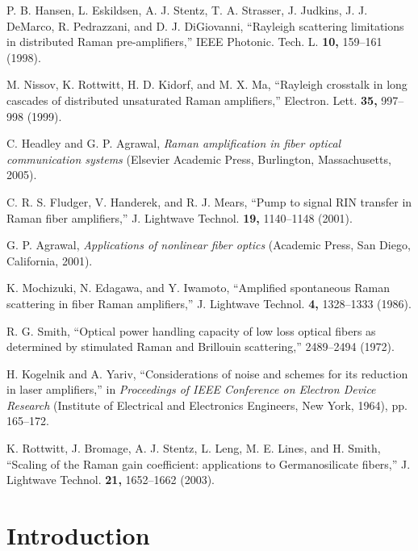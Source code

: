 \documentclass[10pt,letterpaper]{article}
\begin{document}
\begin{thebibliography}{99}
 P. B. Hansen, L. Eskildsen, A. J. Stentz, T. A. Strasser, J. Judkins, J. J. DeMarco, R. Pedrazzani, and D. J. DiGiovanni, ``Rayleigh scattering limitations in distributed Raman pre-amplifiers,'' IEEE Photonic. Tech. L. {\bf 10,} 159--161 (1998).

 M. Nissov, K. Rottwitt, H. D. Kidorf, and M. X. Ma, ``Rayleigh crosstalk in long cascades of distributed unsaturated Raman amplifiers,'' Electron. Lett. {\bf 35,} 997--998 (1999).

 C. Headley and G. P. Agrawal, {\it Raman amplification in fiber optical communication systems} (Elsevier Academic Press, Burlington, Massachusetts, 2005).

 C. R. S. Fludger, V. Handerek, and R. J. Mears, ``Pump to signal RIN transfer in Raman fiber amplifiers,'' J. Lightwave Technol. {\bf 19,} 1140--1148 (2001).

 G. P. Agrawal, {\it Applications of nonlinear fiber optics} (Academic Press, San Diego, California, 2001).

 K. Mochizuki, N. Edagawa, and Y. Iwamoto, ``Amplified spontaneous Raman scattering in fiber Raman amplifiers,'' J. Lightwave Technol. {\bf 4,} 1328--1333 (1986).

 R. G. Smith, ``Optical power handling capacity of low loss optical fibers as determined by stimulated Raman and Brillouin scattering,''  2489--2494 (1972).

 H. Kogelnik and A. Yariv, ``Considerations of noise and schemes for its reduction in laser amplifiers,'' in {\it Proceedings of IEEE Conference on Electron Device Research} (Institute of Electrical and Electronics Engineers, New York, 1964), pp. 165--172.

 K. Rottwitt, J. Bromage, A. J. Stentz, L. Leng, M. E. Lines, and H. Smith, ``Scaling of the Raman gain coefficient: applications to Germanosilicate fibers,'' J. Lightwave Technol. {\bf 21,} 1652--1662 (2003).

\end{thebibliography}

\section{Introduction}
\end{document}

